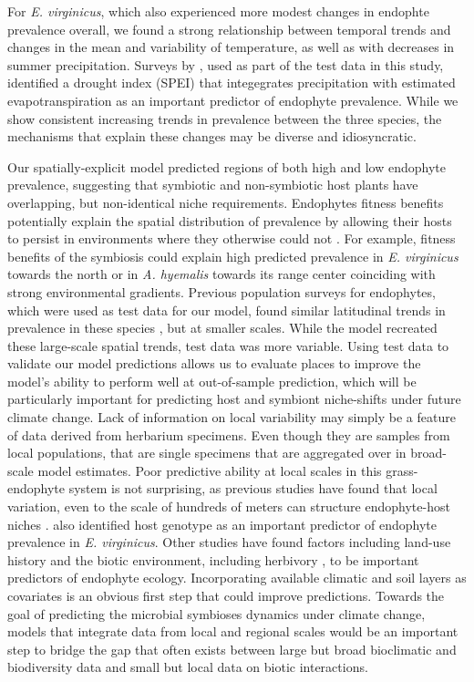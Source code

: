 \documentclass[11pt]{article}
\let\cite\citep
\begin{document}
For \emph{E. virginicus}, which also experienced more modest changes in endophte prevalence overall, we found a strong relationship between temporal trends and  changes in the mean and variability of temperature, as well as with decreases in summer precipitation.
Surveys by \citet{sneck2017variation}, used as part of the test data in this study, identified a drought index (SPEI) that integegrates precipitation with estimated evapotranspiration as an important predictor of endophyte prevalence.
While we show consistent increasing trends in prevalence between the three species, the mechanisms that explain these changes may be diverse and idiosyncratic. 

Our spatially-explicit model predicted regions of both high and low endophyte prevalence, suggesting that symbiotic and non-symbiotic host plants have overlapping, but non-identical niche requirements.
Endophytes fitness benefits potentially explain the spatial distribution of prevalence by allowing their hosts to persist in environments where they otherwise could not \citep{afkhami2014mutualist, kazenel2015mutualistic}.
For example, fitness benefits of the symbiosis could explain high predicted prevalence in \emph{E. virginicus} towards the north or in \emph{A. hyemalis} towards its range center coinciding with strong environmental gradients.
Previous population surveys for endophytes, which were used as test data for our model, found similar latitudinal trends in prevalence in these species \citep{sneck2017variation,rudgers2009benefits}, but at smaller scales. 
While the model recreated these large-scale spatial trends, test data was more variable. 
Using test data to validate our model predictions allows us to evaluate places to improve the model's ability to perform well at out-of-sample prediction, which will be particularly important for predicting host and symbiont niche-shifts under future climate change.
Lack of information on local variability may simply be a feature of data derived from herbarium specimens. 
Even though they are samples from local populations, that are single specimens that are aggregated over in broad-scale model estimates.
Poor predictive ability at local scales in this grass-endophyte system is not surprising, as previous studies have found that local variation, even to the scale of hundreds of meters can structure endophyte-host niches \cite{kazenel2015mutualistic}. 
\citet{sneck2017variation} also identified host genotype as an important predictor of endophyte prevalence in \emph{E. virginicus}.
Other studies have found factors including land-use history \cite{vikuk2019infection} and the biotic environment, including herbivory \cite{rudgers2016long}, to be important predictors of endophyte ecology.
Incorporating available climatic and soil layers as covariates is an obvious first step that could improve predictions.
Towards the goal of predicting the microbial symbioses dynamics under climate change, models that integrate data from local and regional scales would be an important step to bridge the gap that often exists between large but broad bioclimatic and biodiversity data and small but local data on biotic interactions.  \cite{miller2019recent, isaac2020data}
\end{document}
